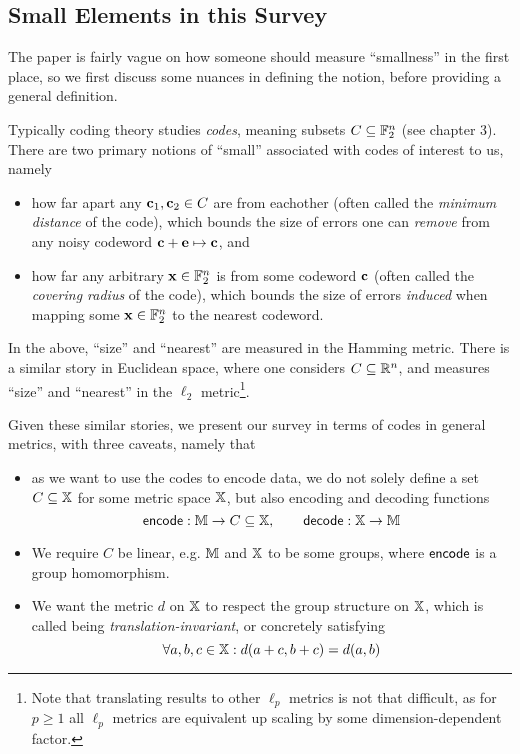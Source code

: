 \subsection{Small Elements in this Survey}\label{ssec: codes}


The paper is fairly vague on how someone should measure ``smallness'' in the first place, so we first discuss some nuances in defining the notion, before providing a general definition.

Typically coding theory studies \emph{codes}, meaning subsets $C\subseteq \mathbb{F}_2^n$ (see \cite{SPLAG} chapter 3).
There are two primary notions of ``small'' associated with codes of interest to us, namely
\begin{itemize}
	\item how far apart any $\mathbf{c}_1, \mathbf{c}_2\in C$ are from eachother (often called the \emph{minimum distance} of the code), which bounds the size of errors one can \emph{remove} from any noisy codeword $\mathbf{c}+\mathbf{e}\mapsto \mathbf{c}$, and
	\item how far any arbitrary $\mathbf{x}\in \mathbb{F}_2^n$ is from some codeword $\mathbf{c}$ (often called the \emph{covering radius} of the code), which bounds the size of errors \emph{induced} when mapping some $\mathbf{x}\in\mathbb{F}_2^n$ to the nearest codeword.
\end{itemize}
In the above, ``size'' and ``nearest'' are measured in the Hamming metric.
There is a similar story in Euclidean space, where one considers $C\subseteq \mathbb{R}^n$, and measures ``size'' and ``nearest'' in the $\ell_2$ metric\footnote{Note that translating results to other $\ell_p$ metrics is not that difficult, as for $p\geq 1$ all $\ell_p$ metrics are equivalent up scaling by some dimension-dependent factor.}.

Given these similar stories, we present our survey in terms of codes in general metrics, with three caveats, namely that
\begin{itemize}
	\item as we want to use the codes to encode data, we do not solely define a set $C\subseteq \mathbb{X}$ for some metric space $\mathbb{X}$, but also encoding and decoding functions
	\begin{equation*}
	\mathsf{encode} : \mathbb{M}\to C\subseteq \mathbb{X},\qquad \mathsf{decode}:\mathbb{X}\to \mathbb{M}
	\end{equation*}
		
	\item We require $C$ be linear, e.g. $\mathbb{M}$ and $\mathbb{X}$ to be some groups, where $\mathsf{encode}$ is a group homomorphism.
	\item We want the metric $d$ on $\mathbb{X}$ to respect the group structure on $\mathbb{X}$, which is called being \emph{translation-invariant}, or concretely satisfying
	\begin{equation*}
	\forall a,b,c \in\mathbb{X} : d(a+c, b+c) = d(a,b)
	\end{equation*}
\end{itemize}


